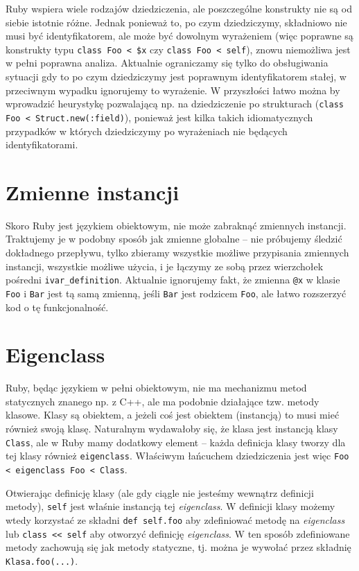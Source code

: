 \documentclass[shortabstract,mgr]{iithesis}
\begin{document}
Ruby wspiera wiele rodzajów dziedziczenia, ale poszczególne konstrukty nie są od siebie istotnie różne. Jednak ponieważ to, po czym dziedziczymy, składniowo nie musi być identyfikatorem, ale może być dowolnym wyrażeniem (więc poprawne są konstrukty typu \texttt{class Foo < \$x} czy \texttt{class Foo < self}), znowu niemożliwa jest w pełni poprawna analiza. Aktualnie ograniczamy się tylko do obsługiwania sytuacji gdy to po czym dziedziczymy jest poprawnym identyfikatorem stałej, w przeciwnym wypadku ignorujemy to wyrażenie. W przyszłości łatwo można by wprowadzić heurystykę pozwalającą np. na dziedziczenie po strukturach (\texttt{class Foo < Struct.new(:field)}), ponieważ jest kilka takich idiomatycznych przypadków w których dziedziczymy po wyrażeniach nie będących identyfikatorami.

\section{Zmienne instancji}

Skoro Ruby jest językiem obiektowym, nie może zabraknąć zmiennych instancji. Traktujemy je w podobny sposób jak zmienne globalne -- nie próbujemy śledzić dokładnego przepływu, tylko zbieramy wszystkie możliwe przypisania zmiennych instancji, wszystkie możliwe użycia, i je łączymy ze sobą przez wierzchołek pośredni \texttt{ivar\_definition}. Aktualnie ignorujemy fakt, że zmienna \texttt{@x} w klasie \texttt{Foo} i \texttt{Bar} jest tą samą zmienną, jeśli \texttt{Bar} jest rodzicem \texttt{Foo}, ale łatwo rozszerzyć kod o tę funkcjonalność.

\section{Eigenclass}

Ruby, będąc językiem w pełni obiektowym, nie ma mechanizmu metod statycznych znanego np. z C++, ale ma podobnie działające tzw. metody klasowe. Klasy są obiektem, a jeżeli coś jest obiektem (instancją) to musi mieć również swoją klasę. Naturalnym wydawałoby się, że klasa jest instancją klasy \texttt{Class}, ale w Ruby mamy dodatkowy element -- każda definicja klasy tworzy dla tej klasy również \texttt{eigenclass}. Właściwym łańcuchem dziedziczenia jest więc \texttt{Foo < eigenclass Foo < Class}.

Otwierając definicję klasy (ale gdy ciągle nie jesteśmy wewnątrz definicji metody), \texttt{self} jest właśnie instancją tej \textit{eigenclass}. W definicji klasy możemy wtedy korzystać ze składni \texttt{def self.foo} aby zdefiniować metodę na \textit{eigenclass} lub \texttt{class << self} aby otworzyć definicję \textit{eigenclass}. W ten sposób zdefiniowane metody zachowują się jak metody statyczne, tj. można je wywołać przez składnię \texttt{Klasa.foo(...)}.
\end{document}
